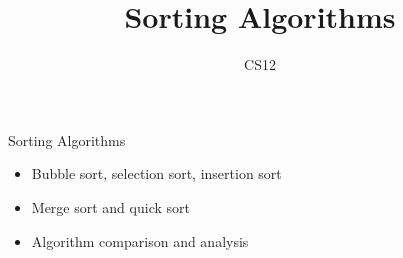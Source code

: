 \documentclass{beamer}
\title{Sorting Algorithms}
\author{CS12}
\date{}
\begin{document}
\begin{frame}
    \titlepage
\end{frame}

\begin{frame}{Sorting Algorithms}
    \begin{itemize}
        \item Bubble sort, selection sort, insertion sort
        \item Merge sort and quick sort
        \item Algorithm comparison and analysis
    \end{itemize}
\end{frame}
\end{document}
